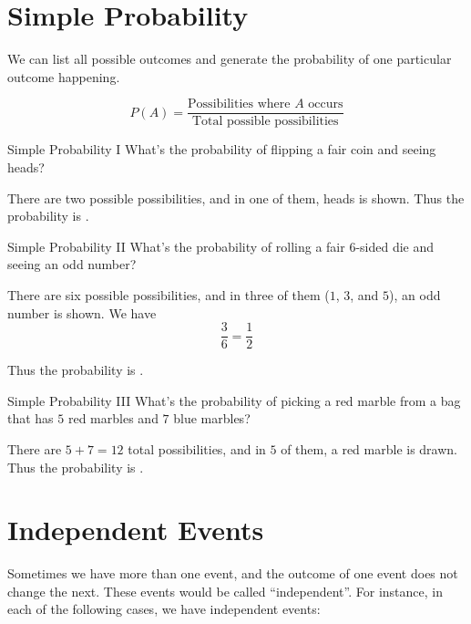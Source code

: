 \documentclass[a4paper,10pt]{report}
\begin{document}
\section{Simple Probability}

We can list all possible outcomes and generate the probability of one particular
outcome happening.

\begin{equation}
 P(A) = \frac{\text{Possibilities where $A$ occurs}}
 {\text{Total possible possibilities}}
\end{equation}


\begin{problem}{Simple Probability I}
 What's the probability of flipping a fair coin and seeing heads?

 \begin{solution}
  There are two possible possibilities, and in one of them, heads is shown. Thus
  the probability is .
 \end{solution}
\end{problem}

\begin{problem}{Simple Probability II}
 What's the probability of rolling a fair $6$-sided die and seeing an odd
 number?

 \begin{solution}
  There are six possible possibilities, and in three of them ($1$, $3$, and
  $5$), an odd number is shown. We have \[
   \frac{3}{6} = \frac{1}{2}
  \]

  Thus the probability is .
 \end{solution}
\end{problem}

\begin{problem}{Simple Probability III}
 What's the probability of picking a red marble from a bag that has $5$ red
 marbles and $7$ blue marbles?

 \begin{solution}
  There are $5+7=12$ total possibilities, and in $5$ of them, a red marble is
  drawn. Thus the probability is .
 \end{solution}
\end{problem}

\section{Independent Events}

Sometimes we have more than one event, and the outcome of one event does not
change the next. These events would be called ``independent''. For instance,
in each of the following cases, we have independent events:
\end{document}
